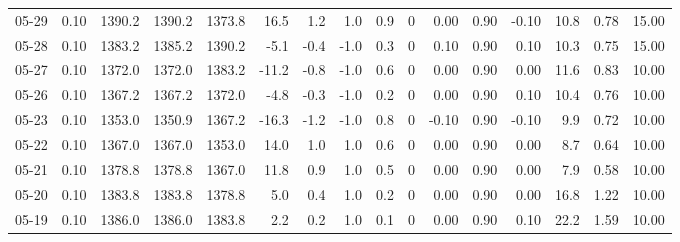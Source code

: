 \begin{threeparttable}
{\begin{tabular}{lrrrrrrrrrrrrrrr}
  05-29 &     0.10 & 1390.2 & 1390.2 & 1373.8 &       16.5 &            1.2 &                      1.0 &                 0.9 &              0 &       0.00 &      0.90 &          -0.10 &             10.8 &            0.78 &                  15.00 \\
  05-28 &     0.10 & 1383.2 & 1385.2 & 1390.2 &       -5.1 &           -0.4 &                     -1.0 &                 0.3 &              0 &       0.10 &      0.90 &           0.10 &             10.3 &            0.75 &                  15.00 \\
  05-27 &     0.10 & 1372.0 & 1372.0 & 1383.2 &      -11.2 &           -0.8 &                     -1.0 &                 0.6 &              0 &       0.00 &      0.90 &           0.00 &             11.6 &            0.83 &                  10.00 \\
  05-26 &     0.10 & 1367.2 & 1367.2 & 1372.0 &       -4.8 &           -0.3 &                     -1.0 &                 0.2 &              0 &       0.00 &      0.90 &           0.10 &             10.4 &            0.76 &                  10.00 \\
  05-23 &     0.10 & 1353.0 & 1350.9 & 1367.2 &      -16.3 &           -1.2 &                     -1.0 &                 0.8 &              0 &      -0.10 &      0.90 &          -0.10 &              9.9 &            0.72 &                  10.00 \\
  05-22 &     0.10 & 1367.0 & 1367.0 & 1353.0 &       14.0 &            1.0 &                      1.0 &                 0.6 &              0 &       0.00 &      0.90 &           0.00 &              8.7 &            0.64 &                  10.00 \\
  05-21 &     0.10 & 1378.8 & 1378.8 & 1367.0 &       11.8 &            0.9 &                      1.0 &                 0.5 &              0 &       0.00 &      0.90 &           0.00 &              7.9 &            0.58 &                  10.00 \\
  05-20 &     0.10 & 1383.8 & 1383.8 & 1378.8 &        5.0 &            0.4 &                      1.0 &                 0.2 &              0 &       0.00 &      0.90 &           0.00 &             16.8 &            1.22 &                  10.00 \\
  05-19 &     0.10 & 1386.0 & 1386.0 & 1383.8 &        2.2 &            0.2 &                      1.0 &                 0.1 &              0 &       0.00 &      0.90 &           0.10 &             22.2 &            1.59 &                  10.00 \\

\end{tabular}}
\end{threeparttable}

